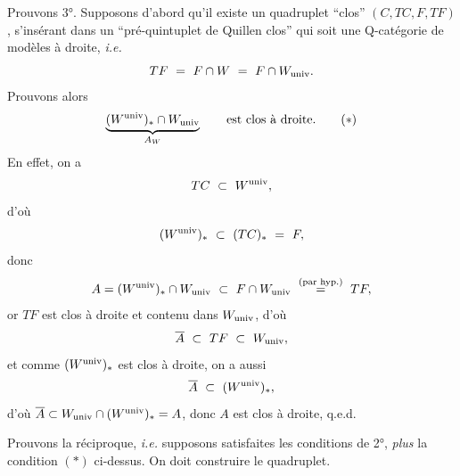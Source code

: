 Prouvons 3°. Supposons d'abord qu'il existe un quadruplet “clos” $(C, TC, F, TF)$, s'insérant dans un “pré-quintuplet de Quillen clos” qui soit une Q-catégorie de modèles à droite, \textit{i.e.}
\[ TF \ =\ F \cap W \ =\ F \cap W_{\mathrm{univ}}. \]
Prouvons alors
\[ \underbrace{(W^{\univ})_* \cap W_{\univ}}_{A_W} \qquad \text{est clos à droite.} \tag*{$(*)$} \]
En effet, on a
\[ TC \ \subset\ W^{\univ}, \]
d'où
\[ (W^{\mathrm{univ}})_* \ \subset\ (TC)_* \ =\ F, \]
donc
\[ A = (W^{\univ})_* \cap W_{\univ} \ \subset\ F \cap W_{\univ} \ \overset{\text{(par hyp.)}}{=}\ TF, \]
or $TF$ est clos à droite et contenu dans $W_{\mathrm{univ}}$, d'où
\[ \overline{A} \ \subset\ TF \ \subset\ W_{\univ}, \]
et comme $(W^{\mathrm{univ}})_*$ est clos à droite, on a aussi
\[ \overline{A} \ \subset\ (W^{\univ})_*, \]
d'où $\overline{A} \subset W_{\mathrm{univ}} \cap (W^{\mathrm{univ}})_* = A$, donc $A$ est clos à droite, q.e.d.

Prouvons la réciproque, \textit{i.e.} supposons satisfaites les conditions de 2°, \textit{plus} la condition $(*)$ ci-dessus. On doit construire le quadruplet.


